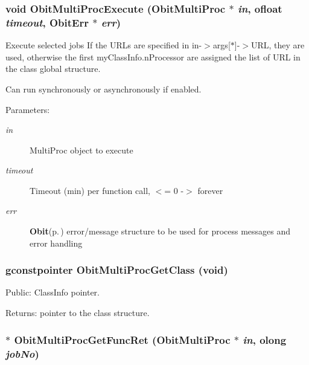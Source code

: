 \subsubsection{\setlength{\rightskip}{0pt plus 5cm}void Obit\-Multi\-Proc\-Execute ({\bf Obit\-Multi\-Proc} $\ast$ {\em in}, {\bf ofloat} {\em timeout}, {\bf Obit\-Err} $\ast$ {\em err})}\label{ObitMultiProc_8c_a20}


Execute selected jobs If the URLs are specified in in-$>$args[$\ast$]-$>$URL, they are used, otherwise the first my\-Class\-Info.n\-Processor are assigned the list of URL in the class global structure. 

Can run synchronously or asynchronously if enabled. \begin{Desc}
\item[Parameters:]
\begin{description}
\item[{\em in}]Multi\-Proc object to execute \item[{\em timeout}]Timeout (min) per function call, $<$= 0 -$>$ forever \item[{\em err}]{\bf Obit}{\rm (p.\,\pageref{structObit})} error/message structure to be used for process messages and error handling \end{description}
\end{Desc}
\subsubsection{\setlength{\rightskip}{0pt plus 5cm}gconstpointer Obit\-Multi\-Proc\-Get\-Class (void)}\label{ObitMultiProc_8c_a12}


Public: Class\-Info pointer. 

\begin{Desc}
\item[Returns:]pointer to the class structure. \end{Desc}
\subsubsection{$\ast$ Obit\-Multi\-Proc\-Get\-Func\-Ret ({\bf Obit\-Multi\-Proc} $\ast$ {\em in}, {\bf olong} {\em job\-No})}\label{ObitMultiProc_8c_a21}



